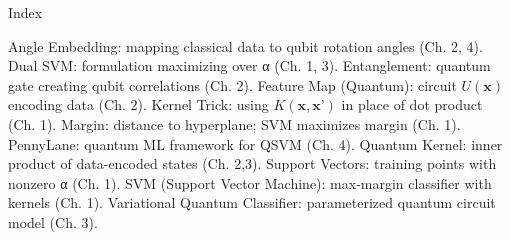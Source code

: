 Index





Angle Embedding: mapping classical data to qubit rotation angles (Ch. 2, 4).
Dual SVM: formulation maximizing over α (Ch. 1, 3).
Entanglement: quantum gate creating qubit correlations (Ch. 2).
Feature Map (Quantum): circuit $U(\mathbf{x})$ encoding data (Ch. 2).
Kernel Trick: using $K(\mathbf{x},\mathbf{x}’)$ in place of dot product (Ch. 1).
Margin: distance to hyperplane; SVM maximizes margin (Ch. 1).
PennyLane: quantum ML framework for QSVM (Ch. 4).
Quantum Kernel: inner product of data-encoded states (Ch. 2,3).
Support Vectors: training points with nonzero α (Ch. 1).
SVM (Support Vector Machine): max-margin classifier with kernels (Ch. 1).
Variational Quantum Classifier: parameterized quantum circuit model (Ch. 3).
